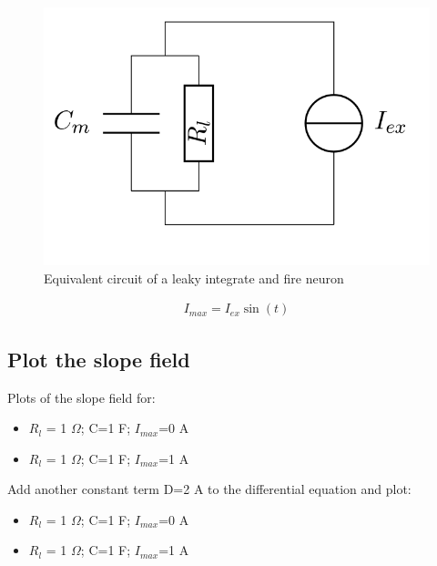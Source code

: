 \documentclass{scrartcl}			%
\begin{document}
\begin{figure}[H]					%
	\centering
	\includegraphics[scale=0.3]{1.png}
	\captionsetup{width=\linewidth}  %
	\caption{Equivalent circuit of a leaky integrate and fire neuron}
	\label{subsec_fig} %
\end{figure}
\begin{align}
I_{max} = I_{ex} \sin(t)
\end{align}			


\subsection{Plot the slope field}
Plots of the slope field for:
\begin{itemize}
	\item $R_{l}$ = 1 $\Omega$; C=1 F; $I_{max}$=0 A
	\item $R_{l}$ = 1 $\Omega$; C=1 F; $I_{max}$=1 A
\end{itemize}
Add another constant term D=2 A to the differential equation and plot:	
\begin{itemize}
	\item $R_{l}$ = 1 $\Omega$; C=1 F; $I_{max}$=0 A
	\item $R_{l}$ = 1 $\Omega$; C=1 F; $I_{max}$=1 A
\end{itemize}
\end{document}

